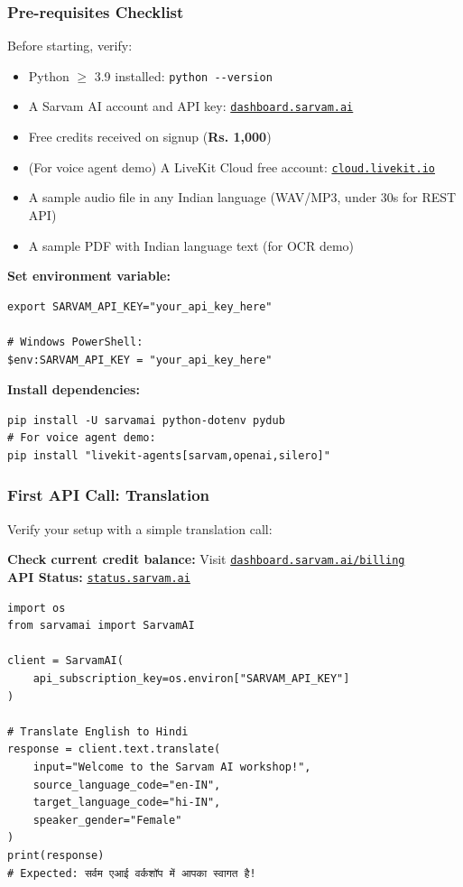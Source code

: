 \begin{frame}[fragile]\frametitle{Pre-requisites Checklist}
Before starting, verify:
  \begin{itemize}
    \item Python $\geq$ 3.9 installed: \lstinline|python --version|
    \item A Sarvam AI account and API key: \href{https://dashboard.sarvam.ai}{\texttt{dashboard.sarvam.ai}}
    \item Free credits received on signup (\textbf{Rs. 1,000})
    \item (For voice agent demo) A LiveKit Cloud free account: \href{https://cloud.livekit.io}{\texttt{cloud.livekit.io}}
    \item A sample audio file in any Indian language (WAV/MP3, under 30s for REST API)
    \item A sample PDF with Indian language text (for OCR demo)
  \end{itemize}

\textbf{Set environment variable:}
\begin{lstlisting}
export SARVAM_API_KEY="your_api_key_here"

# Windows PowerShell:
$env:SARVAM_API_KEY = "your_api_key_here"
\end{lstlisting}

\textbf{Install dependencies:}
\begin{lstlisting}
pip install -U sarvamai python-dotenv pydub
# For voice agent demo:
pip install "livekit-agents[sarvam,openai,silero]"
\end{lstlisting}
\end{frame}

\begin{frame}[fragile]\frametitle{First API Call: Translation}
Verify your setup with a simple translation call:

\textbf{Check current credit balance:} Visit \href{https://dashboard.sarvam.ai/billing}{\texttt{dashboard.sarvam.ai/billing}}\\
\textbf{API Status:} \href{https://status.sarvam.ai}{\texttt{status.sarvam.ai}}
\begin{lstlisting}
import os
from sarvamai import SarvamAI

client = SarvamAI(
    api_subscription_key=os.environ["SARVAM_API_KEY"]
)

# Translate English to Hindi
response = client.text.translate(
    input="Welcome to the Sarvam AI workshop!",
    source_language_code="en-IN",
    target_language_code="hi-IN",
    speaker_gender="Female"
)
print(response)
# Expected: सर्वम एआई वर्कशॉप में आपका स्वागत है!
\end{lstlisting}
\end{frame}


